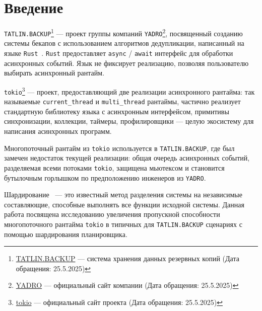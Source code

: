 
\section*{Введение}
\thispagestyle{withCompileDate}

\verb|TATLIN.BACKUP|\footnote{\href{https://yadro.com/ru/tatlin/backup}{TATLIN.BACKUP}
--- система хранения данных резервных копий (Дата обращения: 25.5.2025)} --- проект группы компаний \verb|YADRO|\footnote{\href{https://yadro.com/}{YADRO} --- официальный сайт компании (Дата обращения: 25.5.2025)}, посвященный созданию системы бекапов с использованием алгоритмов дедупликации, написанный на языке \verb|Rust|~\cite{RustCommunity}. \verb|Rust| предоставляет \verb|async| / \verb|await|\cite{fsharpasyncawait} интерфейс для обработки асинхронных событий. Язык не фиксирует реализацию, позволяя пользователю выбирать асинхронный рантайм.

\verb|tokio|\footnote{\href{https://tokio.rs/}{tokio} --- официальный сайт проекта (Дата обращения: 25.5.2025)} --- проект, предоставляющий две реализации асинхронного рантайма: так называемые \verb|current_thread| и \verb|multi_thread| рантаймы, частично реализует стандартную библиотеку языка с асинхронным интерфейсом, примитивы синхронизации, коллекции, таймеры, профилировщики --- целую экосистему для написания асинхронных программ.

Многопоточный рантайм из \verb|tokio| используется в \verb|TATLIN.BACKUP|, где был замечен недостаток текущей реализации: общая очередь асинхронных событий, разделяемая всеми потоками \verb|tokio|, защищена мьютексом и становится бутылочным горлышком по предположению инженеров из \verb|YADRO|.

Шардирование~\cite{ShardingCriticalReview} --- это известный метод разделения системы на независимые составляющие, способные выполнять все функции исходной системы. Данная работа посвящена исследованию увеличения пропускной способности многопоточного рантайма \verb|tokio| в типичных для \verb|TATLIN.BACKUP| сценариях с помощью шардирования планировщика.
